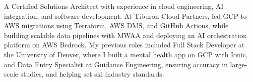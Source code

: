 

\begin{cvparagraph}

A Certified Solutions Architect with experience in cloud engineering, AI integration, and software development. At Tiburon Cloud Partners, led GCP-to-AWS migrations using Terraform, AWS DMS, and GitHub Actions, while building scalable data pipelines with MWAA and deploying an AI orchestration platform on AWS Bedrock. My previous roles included Full Stack Developer at the University of Denver, where I built a mental health app on GCP with Ionic, and Data Entry Specialist at Guidance Engineering, ensuring accuracy in large-scale studies, and helping set ski industry standards.
\end{cvparagraph}

